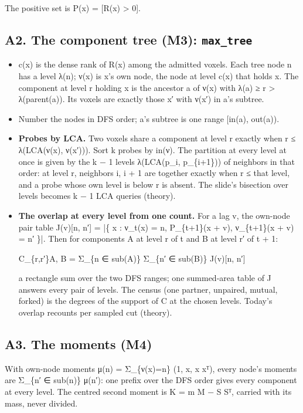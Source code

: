 The positive set is P(x) = [R(x) > 0].

\subsection{\texorpdfstring{A2. The component tree (M3): \texttt{max\_\allowbreak{}tree}}{A2. The component tree (M3): max\_tree}}

\begin{itemize}
\item c(x) is the dense rank of R(x) among the admitted voxels. Each tree node n has a level λ(n); ν(x) is x's own node, the node at level c(x) that holds x. The component at level r holding x is the ancestor a of ν(x) with λ(a) ≥ r > λ(parent(a)). Its voxels are exactly those x′ with ν(x′) in a's subtree.
\item Number the nodes in DFS order; a's subtree is one range [in(a), out(a)).
\item \textbf{Probes by LCA.} Two voxels share a component at level r exactly when r ≤ λ(LCA(ν(x), ν(x′))). Sort k probes by in(ν). The partition at every level at once is given by the k − 1 levels λ(LCA(p\_\allowbreak{}i, p\_\allowbreak{}\{i+1\})) of neighbors in that order: at level r, neighbors i, i + 1 are together exactly when r ≤ that level, and a probe whose own level is below r is absent. The slide's bisection over levels becomes k − 1 LCA queries (theory).
\item \textbf{The overlap at every level from one count.} For a lag v, the own-node pair table J(v)[n, n′] = |\{ x : ν\_\allowbreak{}t(x) = n, P\_\allowbreak{}\{t+1\}(x + v), ν\_\allowbreak{}\{t+1\}(x + v) = n′ \}|. Then for components A at level r of t and B at level r′ of t + 1:

C\_\allowbreak{}\{r,r′\}A, B = Σ\_\allowbreak{}\{n ∈ sub(A)\} Σ\_\allowbreak{}\{n′ ∈ sub(B)\} J(v)[n, n′]

a rectangle sum over the two DFS ranges; one summed-area table of J answers every pair of levels. The census (one partner, unpaired, mutual, forked) is the degrees of the support of C at the chosen levels. Today's overlap recounts per sampled cut (theory).
\end{itemize}

\subsection{\texorpdfstring{A3. The moments (M4)}{A3. The moments (M4)}}

With own-node moments μ(n) = Σ\_\allowbreak{}\{ν(x)=n\} (1, x, x xᵀ), every node's moments are Σ\_\allowbreak{}\{n′ ∈ sub(n)\} μ(n′): one prefix over the DFS order gives every component at every level. The centred second moment is K = m M − S Sᵀ, carried with its mass, never divided.

